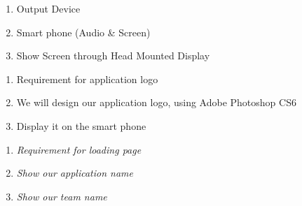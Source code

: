 \documentclass{article}
\begin{document}
\begin{enumerate}
\item  Output Device

\item  Smart phone (Audio \& Screen)

\item  Show Screen through Head Mounted Display
\end{enumerate}



\begin{enumerate}
\item  Requirement for application logo

\item  We will design our application logo, using Adobe Photoshop CS6

\item  Display it on the smart phone
\end{enumerate}



\begin{enumerate}
\item  \textit{Requirement for loading page}

\item \textit{ Show our application name}

\item \textit{ Show our team name}
\end{enumerate}
\end{document}
